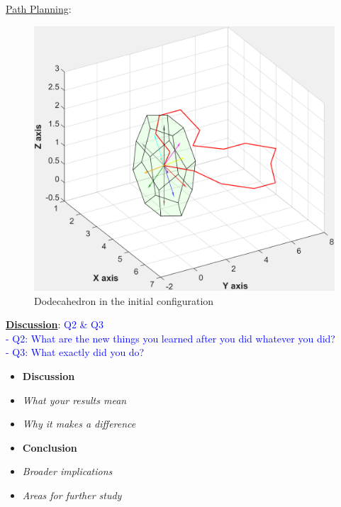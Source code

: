 \noindent\uline{Path Planning}: 
%
\begin{figure}[h]
\centering
	\includegraphics[width=1\textwidth]{image/dodecaPath1.pdf}
	\caption{Dodecahedron in the initial configuration}
	\label{fig:dodecaPath1}
\end{figure}
\newpage
\noindent\uline{\textbf{Discussion}}: 
\textcolor{blue}{Q2 \& Q3\\
- Q2: What are the new things you learned after you did whatever you did?\\
- Q3: What exactly did you do?}

\begin{itemize}
\color{red}
\item \textbf{Discussion}
\item \textit{What your results mean}
\item \textit{Why it makes a difference}
\item \textbf{Conclusion}
\item \textit{Broader implications}
\item \textit{Areas for further study}
\end{itemize}





